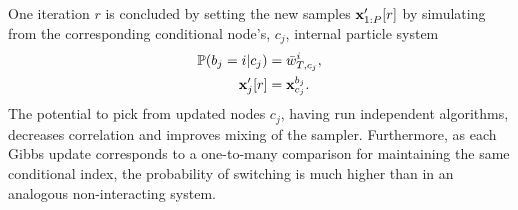 %
One \mcmc iteration $r$ is concluded by setting the new samples $\mathbf{x}_{1:P}'[r]$ by simulating from the corresponding conditional node's, $c_j$, internal particle system
\begin{align}
\label{eq:simTrajectory}
\Prb(b_j = i | c_j) &= \nw_{T,c_j}^i, \nonumber\\%
\xb_j'[r] &= \xb_{c_j}^{b_j}.
\end{align}
The potential to pick from updated nodes $c_j$, having run independent \smc algorithms, decreases correlation and improves mixing of the  \mcmc sampler. Furthermore, as each Gibbs update corresponds to a one-to-many comparison for maintaining the same conditional index, the probability of switching is much higher than in an analogous non-interacting system.

